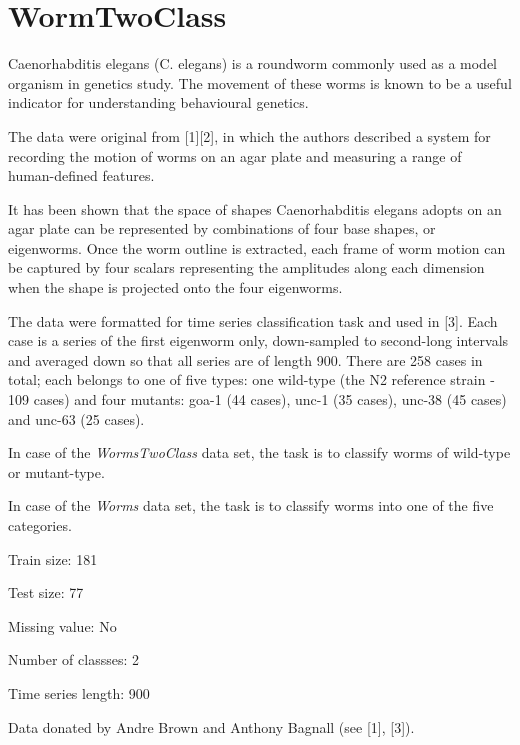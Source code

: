 \chapter{Worm\+Two\+Class}
\hypertarget{md_external_2data_2UCRArchive__2018_2WormsTwoClass_2README}{}\label{md_external_2data_2UCRArchive__2018_2WormsTwoClass_2README}
\label{md_external_2data_2UCRArchive__2018_2WormsTwoClass_2README_autotoc_md233}%
%
 Caenorhabditis elegans (C. elegans) is a roundworm commonly used as a model organism in genetics study. The movement of these worms is known to be a useful indicator for understanding behavioural genetics.

The data were original from \mbox{[}1\mbox{]}\mbox{[}2\mbox{]}, in which the authors described a system for recording the motion of worms on an agar plate and measuring a range of human-\/defined features.

It has been shown that the space of shapes Caenorhabditis elegans adopts on an agar plate can be represented by combinations of four base shapes, or eigenworms. Once the worm outline is extracted, each frame of worm motion can be captured by four scalars representing the amplitudes along each dimension when the shape is projected onto the four eigenworms.

The data were formatted for time series classification task and used in \mbox{[}3\mbox{]}. Each case is a series of the first eigenworm only, down-\/sampled to second-\/long intervals and averaged down so that all series are of length 900. There are 258 cases in total; each belongs to one of five types\+: one wild-\/type (the N2 reference strain -\/ 109 cases) and four mutants\+: goa-\/1 (44 cases), unc-\/1 (35 cases), unc-\/38 (45 cases) and unc-\/63 (25 cases).

In case of the {\itshape Worms\+Two\+Class} data set, the task is to classify worms of wild-\/type or mutant-\/type.

In case of the {\itshape Worms} data set, the task is to classify worms into one of the five categories.

Train size\+: 181

Test size\+: 77

Missing value\+: No

Number of classses\+: 2

Time series length\+: 900

Data donated by Andre Brown and Anthony Bagnall (see \mbox{[}1\mbox{]}, \mbox{[}3\mbox{]}).


